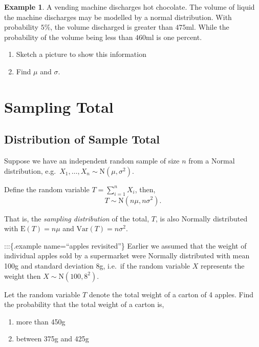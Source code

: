 \documentclass[
]{book}
\theoremstyle{definition}
\theoremstyle{definition}
\newtheorem{example}{Example}[chapter]
\theoremstyle{definition}
\theoremstyle{definition}
\theoremstyle{remark}
\begin{document}
\begin{example}

A vending machine discharges hot chocolate. The volume of liquid the machine discharges may be modelled by a normal distribution. With probability \(5\%\), the volume discharged is greater than \(475\)ml. While the probability of the volume being less than \(460\)ml is one percent.

\begin{enumerate}
\def\labelenumi{\alph{enumi})}
\item
  Sketch a picture to show this information
\item
  Find \(\mu\) and \(\sigma\).
\end{enumerate}

\end{example}

\hypertarget{sampling-total}{%
\section{Sampling Total}\label{sampling-total}}

\subsection{Distribution of Sample Total}

Suppose we have an independent random sample of size \(n\) from a Normal distribution,
e.g.~\(X_1,\ldots,X_n\sim \text{N}(\mu,\sigma^2)\).

Define the random variable \(T=\sum_{i=1}^n X_i\), then,
\[ T \sim \text{N}(n\mu,n\sigma^2). \]

That is, the \emph{sampling distribution} of the total, \(T\), is also Normally distributed with \(\text{E}(T)=n\mu\) and \(\text{Var}(T)=n\sigma^2\).

:::\{.example name=``apples revisited''\}
Earlier we assumed that the weight of
individual apples sold by a supermarket were Normally distributed
with mean 100g and standard deviation 8g, i.e.~if the random variable \(X\)
represents the weight then \(X \sim \text{N}(100,{8^2})\).

Let the random variable \(T\) denote the total weight of a carton of 4 apples. Find the probability that the total weight of a carton is,

\begin{enumerate}
\def\labelenumi{\alph{enumi})}
\item
  more than 450g
\item
  between 375g and 425g
\end{enumerate}
\end{document}
